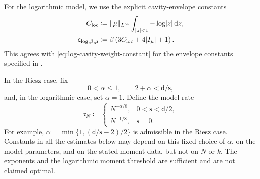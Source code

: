 \documentclass[11pt,reqno]{amsart}
\numberwithin{equation}{section}
\theoremstyle{plain}
\theoremstyle{remark}
\DeclarePairedDelimiter{\abs}{\lvert}{\rvert}
\DeclarePairedDelimiter{\norm}{\lVert}{\rVert}
\renewcommand{\d}{\mathsf{d}}
\newcommand{\md}{\mathrm{d}}
\newcommand{\be}{\beta}
\newcommand{\s}{\mathsf{s}}
\begin{document}
For the logarithmic model, we use the explicit cavity-envelope constants
\begin{align}
 C_{\mathrm{loc}}
 &\coloneqq\norm{\mu}_{L^\infty}
 \int_{\abs{z}<1}-\log\abs{z}\,\md z,
 \label{eq:exact-log-local-constant}\\
 \mathsf c_{\log,\be,\mu}
 &\coloneqq\be\left(3C_{\mathrm{loc}}+4\abs{I_\mu}+1\right).
 \label{eq:exact-log-cavity-constant}
\end{align}
This agrees with \eqref{eq:log-cavity-weight-constant} for the envelope constants specified in .

In the Riesz case, fix
\begin{equation}\label{eq:quantitative-alpha-riesz}
 0<\alpha\leq1,\qquad 2+\alpha<\d/\s,
\end{equation}
and, in the logarithmic case, set $\alpha=1$.  Define the model rate
\begin{equation}\label{eq:quantitative-profile-rate}
 \mathfrak r_N\coloneqq
 \begin{cases}
 N^{-\alpha/8},&0<\s<\d/2,\\
 N^{-1/8},&\s=0.
 \end{cases}
\end{equation}
For example, $\alpha=\min\{1,(\d/\s-2)/2\}$ is admissible in the Riesz
case.  Constants in all the estimates below may depend on this fixed
choice of $\alpha$, on the model parameters, and on the stated moment
data, but not on $N$ or $k$.  The exponents and the logarithmic moment
threshold are sufficient and are not claimed optimal.
\end{document}
